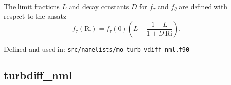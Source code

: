 The limit fractions $L$ and decay constants $D$ for $f_\tau$ and $f_\theta$ are defined with respect to the ansatz
\begin{equation*}
  f_\tau(\mathrm{Ri}) = f_\tau(0) \left( L + \frac{1-L}{1 + D \,\mathrm{Ri}}  \right).
\end{equation*}

Defined and used in: \verb+src/namelists/mo_turb_vdiff_nml.f90+

\subsection{turbdiff\_nml}

